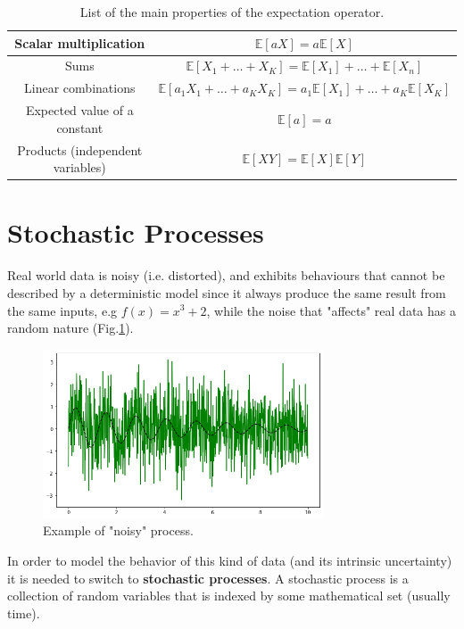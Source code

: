 \documentclass[12pt,a4paper]{book}
\begin{document}
\renewcommand{\arraystretch}{1.4}
\begin{table}[hbt]
	\begin{center}
		\begin{tabular}{|c|c|} \hline
			Scalar multiplication & $\mathbb{E}[aX] = a\mathbb{E}[X]$ \\ \hline
			Sums & $\mathbb{E}[X_1+\ldots +X_K] =  \mathbb{E}[X_1] +\ldots + \mathbb{E}[X_n]$ \\ \hline
			Linear combinations & $\mathbb{E}[a_1X_1+\ldots +a_KX_K] =  a_1\mathbb{E}[X_1] +\ldots + a_K\mathbb{E}[X_K]$ \\ \hline
			Expected value of a constant & $\mathbb{E}[a] = a$ \\ \hline
			Products (independent variables) & $\mathbb{E}[XY] = \mathbb{E}[X] \mathbb{E}[Y]$ \\ \hline
		\end{tabular}
	\end{center}
\caption{List of the main properties of the expectation operator.}
\label{tab:expectation_prop}
\end{table}

\section{Stochastic Processes}
Real world data is noisy (i.e. distorted), and exhibits behaviours that cannot be described by a deterministic model since it always produce the same result from  the same inputs, e.g $f(x)=x^3+2$, while the noise that "affects" real data has a random nature (Fig.\ref{fig:noisy_process}).
\begin{figure}[htbp]
	\begin{center}  
	\includegraphics[height=5cm]{stochastic_process}
	\end{center}
\caption{Example of "noisy" process.}
\label{fig:noisy_process}
\end{figure}

In order to model the behavior of this kind of data (and its intrinsic uncertainty) it is needed to switch to \textbf{stochastic processes}.  
A stochastic process is a collection of random variables that is indexed by some mathematical set (usually time).
\end{document}
